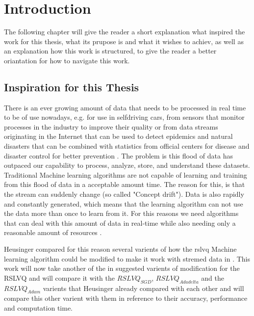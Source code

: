 \documentclass[12pt,oneside,a4paper,parskip]{scrbook}
\begin{document}
\tableofcontents	




\mainmatter

\chapter{Introduction}\label{ch:intro}

The following chapter will give the reader a short explanation what inspired the work for this thesis, what its prupose is 
and what it wishes to achiev, as well as an explanation how this work is structured, to give the reader a better oriantation 
for how to navigate this work.

\section{Inspiration for this Thesis} 
There is an ever growing amount of data that needs to be processed in real time to be of use nowadays, e.g. for use in selfdriving
cars, from sensors that monitor processes in the industry to improve their quality \cite{MLonDataStreams} or from data streams originating in 
the Internet that can be used to detect epidemics and natural disasters that can be combined with statistics from 
official centers for disease and disaster control for better prevention \cite{MLonDataStreams}.
The problem is this flood of data has outpaced our capability to process, analyze, store, and understand these datasets.
Traditional Machine learning algorithms are not capable of learning and training from this flood of data in a acceptable 
amount time. The reason for this, is that the stream can suddenly change (so called "Concept drift"). Data is also 
rapidly and constantly generated, which means that the learning algorithm can not use the data more than once to learn 
from it.
For this reasons we need algorithms that can deal with this amount of data in real-time while also needing only a 
reasonable amount of resources \cite{MLonDataStreams}.

Heusinger compared for this reason several varients of how the \ac{rslvq} Machine learning algorithm could be modified
to make it work with stremed data in \cite{PassiveDriftonRSLVQ}.
This work will now take another of the in \cite{} suggested varients of modification for the RSLVQ and will compare it 
with the $RSLVQ_\textit{SGD}$, $RSLVQ_\textit{Adadelta}$ and the $RSLVQ_\textit{Adam}$ varients that Heusinger already compared with each
other and will compare this other varient with them in reference to their accuracy, performance and computation time.
\end{document}

